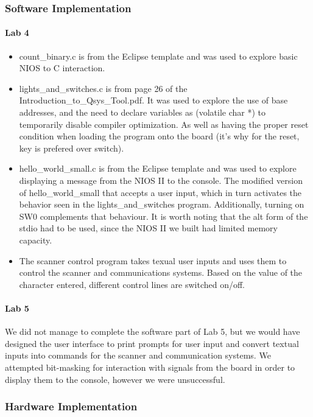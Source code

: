 \documentclass{article}
\begin{document}
    \subsubsection{Software Implementation}
    \paragraph{Lab 4}
    \begin{itemize}
      \item count\_binary.c is from the Eclipse template and was used to explore basic NIOS to C interaction.
      \item lights\_and\_switches.c is from page 26 of the Introduction\_to\_Qsys\_Tool.pdf. It was used to explore the use of base addresses, and the need to declare variables as (volatile char *) to temporarily disable compiler optimization. As well as having the proper reset condition when loading the program onto the board (it’s why for the reset, key is prefered over switch). 
      \item hello\_world\_small.c is from the Eclipse template and was used to explore displaying a message from the NIOS II to the console. The modified version of hello\_world\_small that accepts a user input, which in turn activates the behavior seen in the lights\_and\_switches program. Additionally, turning on SW0 complements that behaviour. It is worth noting that the alt form of the stdio had to be used, since the NIOS II we built had limited memory capacity.
      \item The scanner control program takes texual user inputs and uses them to control the scanner and communications systems. Based on the value of the character entered, different control lines are switched on/off.
    \end{itemize}

    \paragraph{Lab 5} We did not manage to complete the software part of Lab 5, but we would have designed the user interface to print prompts for user input and convert textual inputs into commands for the scanner and communication systems. We attempted bit-masking for interaction with signals from the board in order to display them to the console, however we were unsuccessful.

    \subsubsection{Hardware Implementation}
\end{document}
